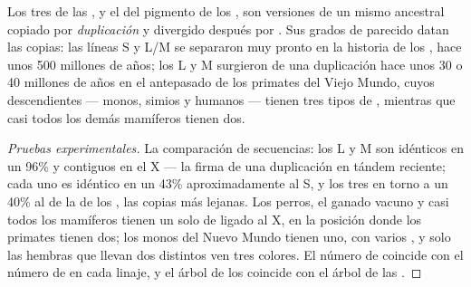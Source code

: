 \begin{proposition}\label{prop:g11:the-eye:family}
Los tres  de las , y el del pigmento de los , son
versiones de un mismo  ancestral copiado por \emph{duplicación} y
divergido después por . Sus grados de parecido datan las
copias: las líneas S y L/M se separaron muy pronto en la historia de
los , hace unos 500 millones de años; los  L y M
surgieron de una duplicación hace unos 30 o 40 millones de años en el
antepasado de los primates del Viejo Mundo, cuyos descendientes ---
monos, simios y humanos --- tienen tres tipos de , mientras que
casi todos los demás mamíferos tienen dos.
\end{proposition}
\begin{proof}[Pruebas experimentales]
La comparación de secuencias: los  L y M son idénticos en un 96\%
y contiguos en el X --- la firma de una duplicación en tándem reciente;
cada uno es idéntico en un 43\% aproximadamente al  S, y los tres en
torno a un 40\% al  de la  de los , las copias más
lejanas. Los perros, el ganado vacuno y casi todos los mamíferos tienen
un solo  de  ligado al X, en la posición donde los primates
tienen dos; los monos del Nuevo Mundo tienen uno, con varios , y
solo las hembras que llevan dos  distintos ven tres colores. El
número de  coincide con el número de  en cada linaje, y el
árbol de los  coincide con el árbol de las .
\end{proof}

